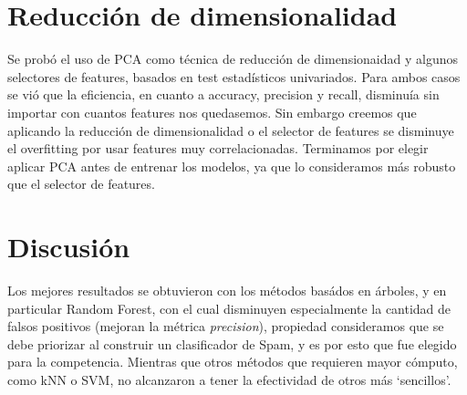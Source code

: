 \documentclass[10pt,a4paper]{article}
\begin{document}




 \section{Reducción de dimensionalidad}

Se probó el uso de PCA como técnica de reducción de dimensionaidad y algunos selectores de features, basados en test estadísticos univariados. Para ambos casos se vió que la eficiencia, en cuanto a accuracy, precision y recall, disminuía sin importar con cuantos features nos quedasemos. Sin embargo creemos que aplicando la reducción de dimensionalidad o el selector de features se disminuye el overfitting por usar features muy correlacionadas. Terminamos por elegir aplicar PCA antes de entrenar los modelos, ya que lo consideramos más robusto que el selector de features.



 \section{Discusión}

Los mejores resultados se obtuvieron con los métodos basádos en árboles, y en particular Random Forest, con el cual disminuyen especialmente la cantidad de falsos positivos (mejoran la métrica \textit{precision}), propiedad consideramos que se debe priorizar al construir un clasificador de Spam, y es por esto que fue elegido para la competencia. Mientras que otros métodos que requieren mayor cómputo, como kNN o SVM, no alcanzaron a tener la efectividad de otros más `sencillos'.
\end{document}
